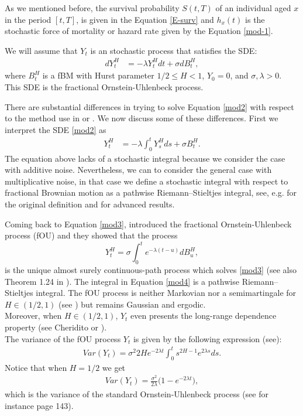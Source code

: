 \documentclass[smallextended]{svjour3}
\begin{document}
As we mentioned before, the survival probability $S(t,T)$ of an individual aged
$x$ in the period $[t,T]$, is given in the Equation \eqref{E-surv}
and $h_x(t)$ is the stochastic force of mortality or hazard rate given by the
Equation \eqref{mod-1}.

We will assume that $Y_t$ is an stochastic process that satisfies the SDE:
\begin{align}
	dY_t^H&=-\lambda Y_t^Hdt+\sigma dB_t^H, \label{mod2}
\end{align}
where $B_t^H $ is a fBM with Hurst parameter $1/2 \le H< 1$,  $Y_0=0$, and
$\sigma,\lambda> 0$.
This SDE is the fractional Ornstein-Uhlenbeck process.


There are substantial differences in trying to solve Equation \eqref{mod2} with
respect to the method use
in \cite{mi-pr} or \cite{gi-or-be}. We now discuss some of these differences.
First we interpret the SDE \eqref{mod2} as
\begin{align}
	Y_t^H&=-\lambda\int_0^t Y_s^Hds+\sigma B_t^H.\label{mod3}
\end{align}
The equation above lacks of a stochastic integral because we
consider the case with additive noise.
Nevertheless, we can to consider the general case with multiplicative
noise, in that case we define a stochastic integral with respect to fractional
Brownian motion as a pathwise Riemann–Stieltjes
integral, see, e.g. \cite{yo} for the original definition and \cite{du-no} for
advanced results.

Coming back to Equation \eqref{mod3}, \cite{ch-ka-ma}
introduced the fractional Ornstein-Uhlenbeck process (fOU) and they 
showed that the process
\begin{equation}
	Y_t ^ H = \sigma \int_0 ^ t e ^ {-\lambda(t - u)} dB_u^H, \label{mod4}
\end{equation}
is the unique almost surely continuous-path process which solves \eqref{mod3}
(see also Theorem 1.24 in \cite{ra}).
The integral in Equation \eqref{mod4} is a
pathwise Riemann–Stieltjes integral.  The fOU process is neither Markovian nor
a semimartingale for $H \in(1/2,1)$ (see \cite{du-no}) but remains
Gaussian and ergodic.\\

Moreover, when $H \in(1/2,1)$, $Y_t$ even presents the long-range dependence
property (see Cheridito
\cite{ch-ka-ma} or  \cite{ra}).\\

The variance of the fOU process $Y_t$ is given by the following expression
(see\cite{ze-ch-ya}):
\begin{align}
Var(Y_t)= \sigma^2 2H e^{-2\lambda t} \int_0^t s^{2H-1} e^{2\lambda s}
ds.\label{var-fou}
\end{align}
Notice that when $H=1/2$ we get
\begin{align}
Var(Y_t)= \frac{\sigma^2}{2\lambda}  \big(1-e^{-2\lambda t}\big),
\end{align}
which is the variance of the standard Ornstein-Uhlenbeck process (see for
instance \cite{mik} page 143). \\
\end{document}
